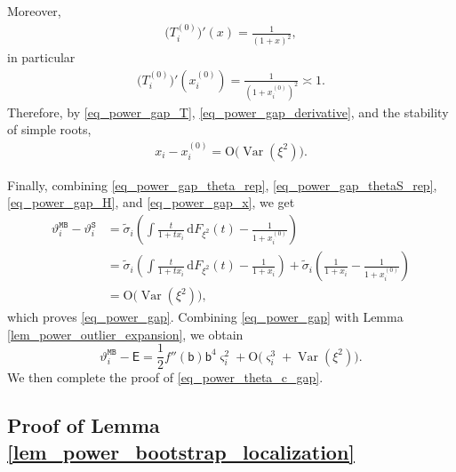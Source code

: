 \documentclass[12pt]{article}
\theoremstyle{plain}
\numberwithin{equation}{section}
\begin{document}
Moreover,
\begin{align*}
	\big(T_i^{(0)}\big)'(x)=\frac{1}{(1+x)^2},
\end{align*}
in particular
\begin{align}\label{eq_power_gap_derivative}
	\big(T_i^{(0)}\big)'(x_i^{(0)})=\frac{1}{(1+x_i^{(0)})^2}\asymp 1.
\end{align}
Therefore, by \eqref{eq_power_gap_T}, \eqref{eq_power_gap_derivative}, and the stability of simple roots,
\begin{align}\label{eq_power_gap_x}
	x_i-x_i^{(0)}
	=
	\mathrm{O}\big(\operatorname{Var}(\xi^2)\big).
\end{align}

Finally, combining \eqref{eq_power_gap_theta_rep}, \eqref{eq_power_gap_thetaS_rep}, \eqref{eq_power_gap_H}, and \eqref{eq_power_gap_x}, we get
\begin{align*}
	\vartheta_i^{\mathtt{MB}}-\vartheta_i^{\mathtt{S}}
	&=
	\widetilde{\sigma}_i
	\left(
	\int\frac{t}{1+t x_i}\,\mathrm{d}F_{\xi^2}(t)-\frac{1}{1+x_i^{(0)}}
	\right)\\
	&=
	\widetilde{\sigma}_i
	\left(
	\int\frac{t}{1+t x_i}\,\mathrm{d}F_{\xi^2}(t)-\frac{1}{1+x_i}
	\right)
	+
	\widetilde{\sigma}_i
	\left(
	\frac{1}{1+x_i}-\frac{1}{1+x_i^{(0)}}
	\right)\\
	&=
	\mathrm{O}\big(\operatorname{Var}(\xi^2)\big),
\end{align*}
which proves \eqref{eq_power_gap}. Combining \eqref{eq_power_gap} with Lemma \ref{lem_power_outlier_expansion}, we obtain
\[
\vartheta_i^{\mathtt{MB}}-\mathsf E
=
\frac{1}{2}f''(\mathsf b)\mathsf b^4\varsigma_i^2
+
\mathrm{O}\big(\varsigma_i^3+\operatorname{Var}(\xi^2)\big).
\]
We then complete the proof of \eqref{eq_power_theta_c_gap}.



\subsection{Proof of Lemma \ref{lem_power_bootstrap_localization}}\label{sec_proof_lemma_bootstraplocation}
\end{document}
